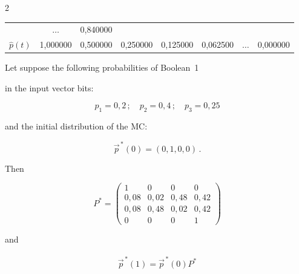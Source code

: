 \begin{multicols}{2}
\begin{table}
\begin{center}
\begin{tabular}{lccccccc}
                      & $\ldots$ & 0,840000 \\


$\hat p(t)$

       & 1,000000 & 0,500000 & 0,250000 & 0,125000 & 0,062500

                      & $\ldots$ & 0,000000 \\

\hline

\end{tabular}

\end{center}

\end{table}



Let suppose the following probabilities of Boolean~1

in the input vector bits:

$$

p_1=0{{,}}2\,;\quad

p_2=0{,}4\,;\quad

p_3=0{,}25

$$

and the initial distribution of the MC:

$$

\vec p^{\,*}(0) = (0,1,0,0)\,.

$$

Then

$$

P^*

=

\begin{pmatrix}

1      &   0    &   0    &   0       \\

0{,}08 & 0{,}02 & 0{,}48 &  0{,}42   \\

0{,}08 & 0{,}48 & 0{,}02 &  0{,}42   \\

0      &   0    & 0      &   1

\end{pmatrix}

$$

and

\begin{multline*}

\vec p^{\,*}(1)

=

\vec p^{\,*}(0) P^*


\end{multline*}
\end{multicols}
